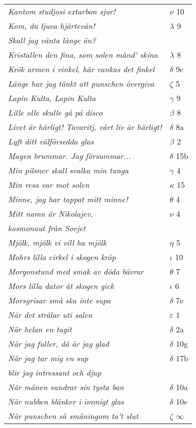 \documentclass[a6paper,10pt]{article}
\begin{document}
\newpage
\begin{table}[!h]
\begin{tabular}{l l}
\textit{Kantom studjosi extarbon sjur!}	&$\nu$ 10\\
\textit{Kom, du ljuva hjärtevän!}	&$\lambda$ 9\\
\textit{Skall jag vänta länge än?} &\\
\textit{Kristallen den fina, som solen månd' skina}	&$\lambda$ 8\\
\textit{Krök armen i vinkel, här vankas det finkel}	&$\delta$ 9c\\
\textit{Länge har jag tänkt att punschen övergiva}	&$\zeta$ 5\\
\textit{Lapin Kulta, Lapin Kulta}	&$\gamma$ 9\\
\textit{Lille olle skulle gå på disco}	&$\beta$ 8\\
\textit{Livet är härligt! Tavaritj, vårt liv är härligt!}	&$\delta$ 8a\\
\textit{Lyft ditt välförsedda glas}	&$\beta$ 2\\
\textit{Magen brummar. Jag försummar...}	&$\delta$ 15b\\
\textit{Min pilsner skall svalka min tunga}	&$\gamma$ 4\\
\textit{Min resa var mot solen} &$\kappa$ 15\\
\textit{Minne, jag har tappat mitt minne!}	&$\theta$ 4\\
\textit{Mitt namn är Nikolajev,}	&$\nu$ 4\\
\textit{kosmonaut från Sovjet} &\\
\textit{Mjölk, mjölk vi vill ha mjölk}	&$\eta$ 5\\
\textit{Mohrs lilla cirkel i skogen kröp}	&$\iota$ 10\\
\textit{Morgonstund med smak av döda bävrar}	&$\theta$ 7\\
\textit{Mors lilla dator åt skogen gick}	&$\iota$ 6\\
\textit{Morsgrisar små ska inte supa}	&$\delta$ 7e\\
\textit{När det strålar uti salen}	&$\varepsilon$ 1\\
\textit{När helan en tagit}	&$\delta$ 2a\\
\textit{När jag fuller, då är jag glad}	&$\delta$ 10g\\
\textit{När jag tar mig en sup}	&$\delta$ 17b\\
\textit{blir jag intressant och djup} &\\
\textit{När månen vandrar sin tysta ban}	&$\delta$ 10a\\
\textit{När nubben blänker i immigt glas}	&$\delta$ 10e\\
\textit{När punschen så småningom ta't slut}	&$\zeta$ $\infty$\\
\end{tabular}
\end{table}
\end{document}

